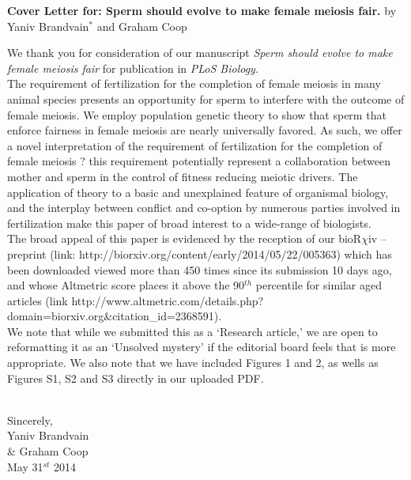 \documentclass[10pt]{article}
\date{}
\begin{document}
\begin{flushleft}
\textbf{Cover Letter for: Sperm should evolve to make female meiosis fair.}
\newline by Yaniv Brandvain$^{\ast}$ and  Graham Coop \\

\end{flushleft}

We thank you for consideration of our manuscript \emph{Sperm should evolve to make female meiosis fair} for publication in \emph{PLoS Biology}. 
\\ 

The requirement of fertilization for the completion of female meiosis in many animal species presents an opportunity for sperm to interfere with the outcome of female meiosis. We employ population genetic theory to show that sperm that enforce fairness in female meiosis are nearly universally favored. As such, we offer a novel interpretation of the requirement of fertilization for the completion of female meiosis ? this requirement potentially represent a collaboration between mother and sperm in the control of fitness reducing meiotic drivers. The application of theory to a basic and unexplained feature of organismal biology, and the interplay between conflict and co-option by numerous parties involved in fertilization make this paper of broad interest to a wide-range of biologists.
\\

The broad appeal of this paper is evidenced by the reception of our bioR$\chi$iv -- preprint (link: http://biorxiv.org/content/early/2014/05/22/005363) which has been downloaded viewed more than 450 times since its submission 10 days ago, and whose Altmetric score places it above the 90$^{th}$ percentile for similar aged articles (link http://www.altmetric.com/details.php?domain=biorxiv.org\&citation\_id=2368591).
\\

We note that while we submitted this as a `Research article,' we are open to reformatting it as an `Unsolved mystery' if the editorial board feels that is more appropriate.  We also note that we have included Figures 1 and 2, as wells as Figures S1, S2 and S3 directly in our uploaded PDF.
\\
\\ 
\begin{flushright}
Sincerely,\\
Yaniv Brandvain \\ \& Graham Coop\\
May 31$^{st}$ 2014
\end{flushright}
\end{document}
